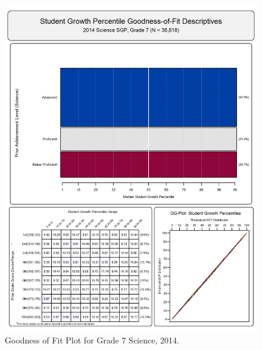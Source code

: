 \documentclass[12pt]{article}
\begin{document}
\begin{figure}[htbp]
\centering
\includegraphics{../img/Goodness_of_Fit/SCIENCE.2014/2014_SCIENCE_7;2013_SCIENCE_6;2012_SCIENCE_5;2011_SCIENCE_4.png}
\caption{Goodness of Fit Plot for Grade 7 Science, 2014.}
\end{figure}
\end{document}
